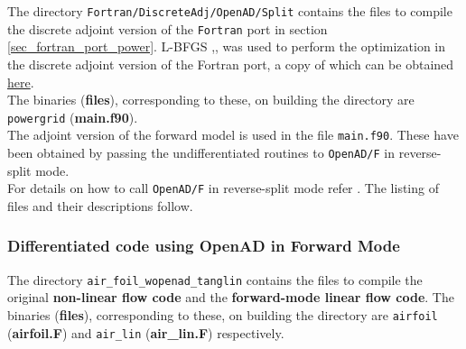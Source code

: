 \noindent The directory \texttt{Fortran/DiscreteAdj/OpenAD/Split} contains the files to compile the discrete adjoint version of the \texttt{Fortran} port in section \ref{sec_fortran_port_power}. L-BFGS \cite{Byrd_1996},\cite{Zhu_1997},\cite{Morales_2011} was used to perform the optimization in the discrete adjoint version of the Fortran port, a copy of which can be obtained \href{http://users.iems.northwestern.edu/~nocedal/lbfgsb.html}{here}.\\

\noindent The binaries (\textbf{files}), corresponding to these, on building the directory are \texttt{powergrid} (\textbf{{main.f90}}).\\

\noindent The adjoint version of the forward model is used in the file  \texttt{main.f90}. These have been obtained by passing the undifferentiated routines to \texttt{OpenAD/F} in reverse-split mode.\\

\noindent For details on how to call \texttt{OpenAD/F} in reverse-split mode refer \cite{Utke_2014}. The listing of files and their descriptions follow.\\


\clearpage
\subsubsection{Differentiated code using OpenAD in Forward Mode}
\noindent The directory \texttt{air\_foil\_wopenad\_tanglin} contains the files to compile the original \textbf{non-linear flow code} and the \textbf{forward-mode linear flow code}. The binaries (\textbf{files}), corresponding to these, on building the directory are \texttt{airfoil} (\textbf{{airfoil.F}}) and \texttt{air\_lin} (\textbf{{air\_lin.F}}) respectively. \\

